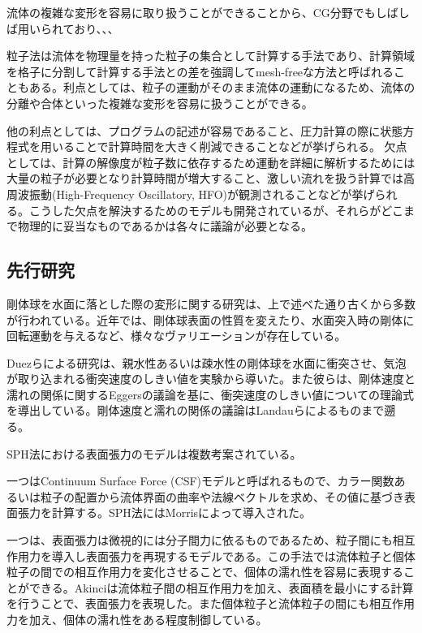 \documentclass[]{jsarticle}
\begin{document}
流体の複雑な変形を容易に取り扱うことができることから、CG分野でもしばしば用いられており、、、

粒子法は流体を物理量を持った粒子の集合として計算する手法であり、計算領域を格子に分割して計算する手法との差を強調してmesh-freeな方法と呼ばれることもある。利点としては、粒子の運動がそのまま流体の運動になるため、流体の分離や合体といった複雑な変形を容易に扱うことができる。

他の利点としては、プログラムの記述が容易であること、圧力計算の際に状態方程式を用いることで計算時間を大きく削減できることなどが挙げられる。
欠点としては、計算の解像度が粒子数に依存するため運動を詳細に解析するためには大量の粒子が必要となり計算時間が増大すること、激しい流れを扱う計算では高周波振動(High-Frequency Oscillatory, HFO)が観測されることなどが挙げられる。こうした欠点を解決するためのモデルも開発されているが、それらがどこまで物理的に妥当なものであるかは各々に議論が必要となる。

\subsection{先行研究}
剛体球を水面に落とした際の変形に関する研究は、上で述べた通り古くから多数が行われている。近年では、剛体球表面の性質を変えたり、水面突入時の剛体に回転運動を与えるなど、様々なヴァリエーションが存在している。

Duez\cite{Duez2007}らによる研究は、親水性あるいは疎水性の剛体球を水面に衝突させ、気泡が取り込まれる衝突速度のしきい値を実験から導いた。また彼らは、剛体速度と濡れの関係に関するEggers\cite{Eggers2004}の議論を基に、衝突速度のしきい値についての理論式を導出している。剛体速度と濡れの関係の議論はLandau\cite{landau1942}らによるものまで遡る。

SPH法における表面張力のモデルは複数考案されている。

一つはContinuum Surface Force (CSF)モデルと呼ばれるもので、カラー関数あるいは粒子の配置から流体界面の曲率や法線ベクトルを求め、その値に基づき表面張力を計算する。SPH法にはMorris\cite{Morris2000}によって導入された。

一つは、表面張力は微視的には分子間力に依るものであるため、粒子間にも相互作用力を導入し表面張力を再現するモデルである。この手法では流体粒子と個体粒子の間での相互作用力を変化させることで、個体の濡れ性を容易に表現することができる。Akinci\cite{Akinci2013}は流体粒子間の相互作用力を加え、表面積を最小にする計算を行うことで、表面張力を表現した。また個体粒子と流体粒子の間にも相互作用力を加え、個体の濡れ性をある程度制御している。
\end{document}
